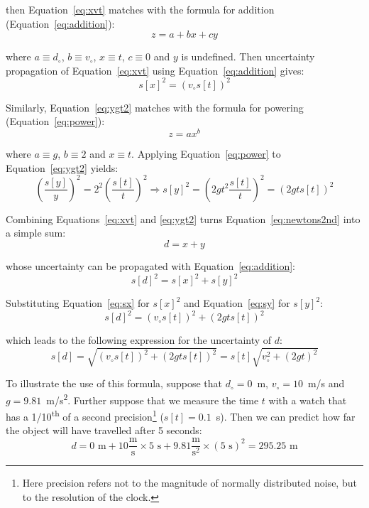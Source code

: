 \begin{enumerate}
  \noindent then Equation~\ref{eq:xvt} matches with the formula for
  addition (Equation~\ref{eq:addition}):
  \[
  z = a + bx + cy
  \]

  \noindent where $a \equiv d_\circ$, $b \equiv v_\circ$, $x \equiv t$,
  $c \equiv 0$ and $y$ is undefined. Then uncertainty propagation of
  Equation~\ref{eq:xvt} using Equation~\ref{eq:addition} gives:
  \begin{equation}
    s[x]^2 = \left(v_\circ s[t]\right)^2
    \label{eq:sx}
  \end{equation}

  Similarly, Equation~\ref{eq:ygt2} matches with the formula for
  powering (Equation~\ref{eq:power}):
  \[
  z = a x^b
  \]

  \noindent where $a \equiv g$, $b \equiv 2$ and $x \equiv t$. Applying
  Equation~\ref{eq:power} to Equation~\ref{eq:ygt2} yields:
  \begin{equation}
    \left(\frac{s[y]}{y}\right)^2 =  2^2 \left(\frac{s[t]}{t}\right)^2
    \Rightarrow s[y]^2 = \left(2 g t^2 \frac{s[t]}{t}\right)^2 =
    \left(2 g t s[t]\right)^2
    \label{eq:sy}
  \end{equation}

  Combining Equations~\ref{eq:xvt} and \ref{eq:ygt2} turns
  Equation~\ref{eq:newtons2nd} into a simple sum:
  \[
  d = x + y
  \]

  \noindent whose uncertainty can be propagated with
  Equation~\ref{eq:addition}:
  \[
  s[d]^2 = s[x]^2 + s[y]^2
  \]

  Substituting Equation~\ref{eq:sx} for $s[x]^2$ and
  Equation~\ref{eq:sy} for $s[y]^2$:
  \[
  s[d]^2 = \left(v_\circ s[t]\right)^2 + \left(2 g t s[t]\right)^2
  \]

  \noindent which leads to the following expression for the
  uncertainty of $d$:
  \begin{equation}
    s[d] = \sqrt{\left(v_\circ s[t]\right)^2 + \left(2 g t s[t]\right)^2}
    = s[t] \sqrt{v_\circ^2 + \left(2 g t\right)^2}
    \label{eq:sdnewton}
  \end{equation}

  To illustrate the use of this formula, suppose that $d_\circ=0$~m,
  $v_\circ=10$~m/s and $g=9.81$~m/s\textsuperscript{2}.  Further
  suppose that we measure the time $t$ with a watch that has a
  1/10\textsuperscript{th} of a second precision\footnote{Here
    precision refers not to the magnitude of normally distributed
    noise, but to the resolution of the clock.} ($s[t]=0.1$~s). Then
  we can predict how far the object will have travelled after 5
  seconds:
  \begin{equation}
  d = 0 \mbox{~m} +
  10 \frac{\mbox{m}}{\mbox{s}} \times 5 \mbox{~s} +
  9.81\frac{\mbox{m}}{\mbox{s}^2} \times (5 \mbox{~s})^2 = 295.25\mbox{~m}
  \label{eq:snowy}
  \end{equation}


\end{enumerate}
